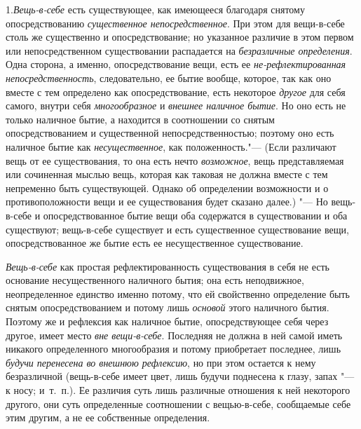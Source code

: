 1.{\em Вещь-в-себе} есть
существующее, как имеющееся благодаря снятому опосредствованию
{\em существенное непосредственное}. При этом для
вещи-в-себе столь же существенно и опосредствование; но указанное различие
в этом первом или непосредственном существовании распадается на
{\em безразличные определения}. Одна сторона, а именно,
опосредствование вещи, есть ее {\em не-рефлектированная
непосредственность}, следовательно, ее бытие вообще, которое, так как оно
вместе с тем определено как опосредствование, есть некоторое
{\em другое} для себя самого, внутри себя {\em многообразное} и {\em внешнее
наличное бытие}. Но оно есть не только наличное бытие, а находится в
соотношении со снятым опосредствованием и существенной непосредственностью;
поэтому оно есть наличное бытие как
{\em несущественное}, как положенность."--- (Если
различают вещь от ее существования, то она есть нечто
{\em возможное}, вещь представляемая или сочиненная
мыслью вещь, которая как таковая не должна вместе с тем непременно быть
существующей. Однако об определении возможности и о противоположности вещи
и ее существования будет сказано далее.) "--- Но вещь-в-себе и
опосредствованное бытие вещи оба содержатся в существовании и оба
существуют; вещь-в-себе существует и есть существенное существование вещи,
опосредствованное же бытие есть ее несущественное существование.

{\em Вещь-в-себе} как простая рефлектированность
существования в себя не есть основание несущественного наличного бытия; она
есть неподвижное, неопределенное единство именно потому, что ей свойственно
определение быть снятым опосредствованием и потому лишь
{\em основой} этого наличного бытия. Поэтому же и
рефлексия как наличное бытие, опосредствующее себя через другое, имеет
место {\em вне вещи-в-себе}. Последняя не должна в ней
самой иметь никакого определенного многообразия и потому приобретает
последнее, лишь {\em будучи перенесена во внешнюю
рефлексию}, но при этом остается к нему безразличной (вещь-в-себе имеет
цвет, лишь будучи поднесена к глазу, запах "--- к носу; и~т.~п.). Ее различия
суть лишь различные отношения к ней некоторого другого, они суть
определенные соотношении с вещью-в-себе, сообщаемые себе этим другим, а не
ее собственные определения.

